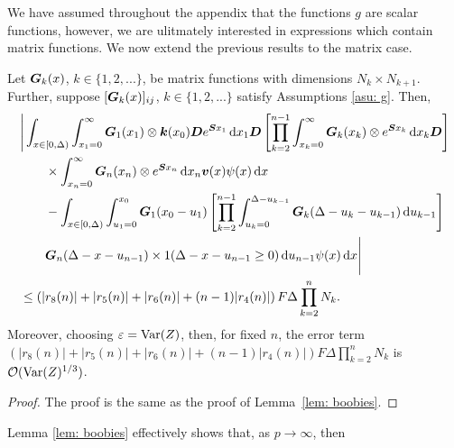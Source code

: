 We have assumed throughout the appendix that the functions \(g\) are scalar functions, however, we are ulitmately interested in expressions which contain matrix functions. We now extend the previous results to the matrix case.
\begin{lem}\label{lem: boobies2}
	Let \(\boldsymbol G_k(x)\), \(k\in\{1,2,...\}\), be matrix functions with dimensions \(N_k \times N_{k+1}\). Further, suppose \([\boldsymbol G_k(x)]_{ij}\), \(k\in\{1,2,...\}\) satisfy Assumptions \ref{asu: g}. Then, 
	\begin{align}
		&\Bigg| \int_{x\in[0,\Delta)} \int_{x_1=0}^\infty \boldsymbol G_1(x_1) \otimes \boldsymbol k(x_0) \boldsymbol D e^{\boldsymbol{S}x_1}\, \mathrm{d} x_1\boldsymbol D 
				\left[\prod_{k=2}^{n-1}\int_{x_k=0}^\infty \boldsymbol G_{k}(x_k) \otimes e^{\boldsymbol{S}x_k} \, \mathrm{d} x_k
		\boldsymbol D\right] \nonumber 
				\\&\qquad{}\times\int_{x_n=0}^\infty \boldsymbol G_{n}(x_n) \otimes e^{\boldsymbol{S}x_n} \, \mathrm{d} x_n {\boldsymbol v}(x) \psi(x)\, \mathrm{d} x \nonumber 
		\\&\qquad {}- \int_{x\in[0,\Delta)} \int_{u_1=0}^{x_0}\boldsymbol G_1(x_0 - u_1)
		\left[\prod_{k=2}^{n-1} \int_{u_k=0}^{\Delta-u_{k-1}} \boldsymbol {G}_{k}(\Delta-u_k-u_{k-1})\, \mathrm{d} u_{k-1}\right] \nonumber 
				\\&\qquad{} \boldsymbol G_{n}(\Delta - x-u_{n-1})
	 		\times1(\Delta-x-u_{n-1}\geq0)\, \mathrm{d} u_{n-1}\psi(x)\, \mathrm{d} x \Bigg| \nonumber
		\\&\leq \left(|r_8(n)|+|r_5(n)|+|r_6(n)| + (n-1)|r_4(n)|\right)F\Delta \prod_{k=2}^{n}N_{k}.\label{eqn: KAFnnmna22G}
	\end{align}
	Moreover, choosing \(\varepsilon=\mathrm{Var}(Z)\), then, for fixed \(n\), the error term \(\left(|r_8(n)|+|r_5(n)|+|r_6(n)| + (n-1)|r_4(n)|\right)F\Delta \prod_{k=2}^{n}N_{k}\) is \(\mathcal O(\mathrm{Var}(Z)^{1/3})\). 
\end{lem}
\begin{proof}
	The proof is the same as the proof of Lemma~\ref{lem: boobies}.
\end{proof}
Lemma \ref{lem: boobies} effectively shows that, as \(p \to \infty\), then 
